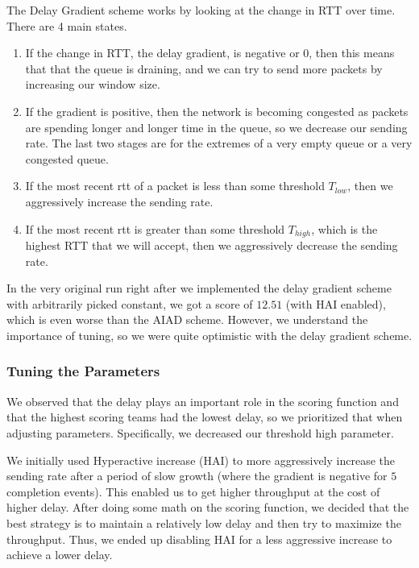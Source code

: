 \documentclass[11pt,a4paper]{article}
\begin{document}
The Delay Gradient scheme works by looking at the change in RTT over time. There
are 4 main states. \begin{enumerate}
  \item If the change in RTT, the delay gradient, is negative or
0, then this means that that the queue is draining, and we can try to send more
packets by increasing our window size.
\item If the gradient is positive, then the
network is becoming congested as packets are spending longer and longer time in
the queue, so we decrease our sending rate. The last two stages are for the
extremes of a very empty queue or a very congested queue.
\item If the most recent
  rtt of a packet is less than some threshold $T_{low}$, then we aggressively increase
the sending rate. 
\item If the most recent rtt is greater than some threshold
  $T_{high}$, which is the highest RTT that we will accept, then we aggressively
decrease the sending rate. 
  
\end{enumerate}

In the very original run right after we implemented the delay gradient scheme
with arbitrarily picked constant, we got a score of $12.51$ (with HAI enabled), which is even worse
than the AIAD scheme. However, we understand the importance of tuning, so we
were quite optimistic with the delay gradient scheme.

\subsubsection{Tuning the Parameters}

We observed that the delay plays an important role in the scoring function and
that the highest scoring teams had the lowest delay, so we
prioritized that when adjusting parameters. Specifically, we decreased our
threshold high parameter.

We initially used Hyperactive increase (HAI) to more aggressively increase the sending
rate after a period of slow growth (where the gradient is negative for $5$
completion events). This enabled us to get higher throughput at the cost of
higher delay. After doing some math on the scoring function, we decided that the
best strategy is to maintain a relatively low delay and then try to maximize the
throughput. Thus, we ended up disabling HAI for a less aggressive increase to
achieve a lower delay. 
\end{document}
